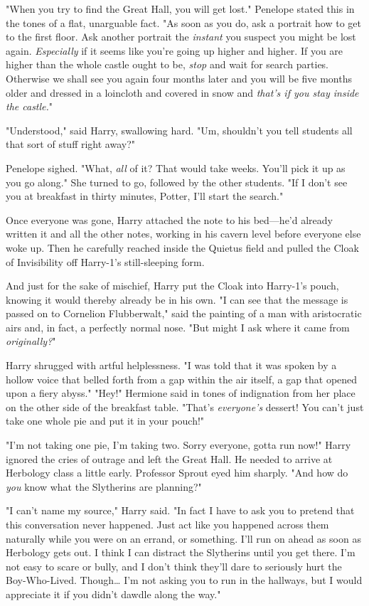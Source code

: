 "When you try to find the Great Hall, you will get lost." Penelope stated this 
in the tones of a flat, unarguable fact. "As soon as you do, ask a portrait how 
to get to the first floor. Ask another portrait the \emph{instant} you suspect 
you might be lost again. \emph{Especially} if it seems like you're going up 
higher and higher. If you are higher than the whole castle ought to be, 
\emph{stop} and wait for search parties. Otherwise we shall see you again four 
months later and you will be five months older and dressed in a loincloth and 
covered in snow and \emph{that's if you stay inside the castle.}"

"Understood," said Harry, swallowing hard. "Um, shouldn't you tell students all 
that sort of stuff right away?"

Penelope sighed. "What, \emph{all} of it? That would take weeks. You'll pick it 
up as you go along." She turned to go, followed by the other students. "If I 
don't see you at breakfast in thirty minutes, Potter, I'll start the search."

Once everyone was gone, Harry attached the note to his bed---he'd already 
written it and all the other notes, working in his cavern level before everyone 
else woke up. Then he carefully reached inside the Quietus field and pulled the 
Cloak of Invisibility off Harry-1's still-sleeping form.

And just for the sake of mischief, Harry put the Cloak into Harry-1's pouch, 
knowing it would thereby already be in his own.
\sbreak
"I can see that the message is passed on to Cornelion Flubberwalt," said the 
painting of a man with aristocratic airs and, in fact, a perfectly normal nose. 
"But might I ask where it came from \emph{originally?}"

Harry shrugged with artful helplessness. "I was told that it was spoken by a 
hollow voice that belled forth from a gap within the air itself, a gap that 
opened upon a fiery abyss."
\sbreak
"Hey!" Hermione said in tones of indignation from her place on the other side 
of the breakfast table. "That's \emph{everyone's} dessert! You can't just take 
one whole pie and put it in your pouch!"

"I'm not taking one pie, I'm taking two. Sorry everyone, gotta run now!" Harry 
ignored the cries of outrage and left the Great Hall. He needed to arrive at 
Herbology class a little early.
\sbreak
Professor Sprout eyed him sharply. "And how do \emph{you} know what the 
Slytherins are planning?"

"I can't name my source," Harry said. "In fact I have to ask you to pretend 
that this conversation never happened. Just act like you happened across them 
naturally while you were on an errand, or something. I'll run on ahead as soon 
as Herbology gets out. I think I can distract the Slytherins until you get 
there. I'm not easy to scare or bully, and I don't think they'll dare to 
seriously hurt the Boy-Who-Lived. Though{\ldots} I'm not asking you to run in 
the hallways, but I would appreciate it if you didn't dawdle along the way."

